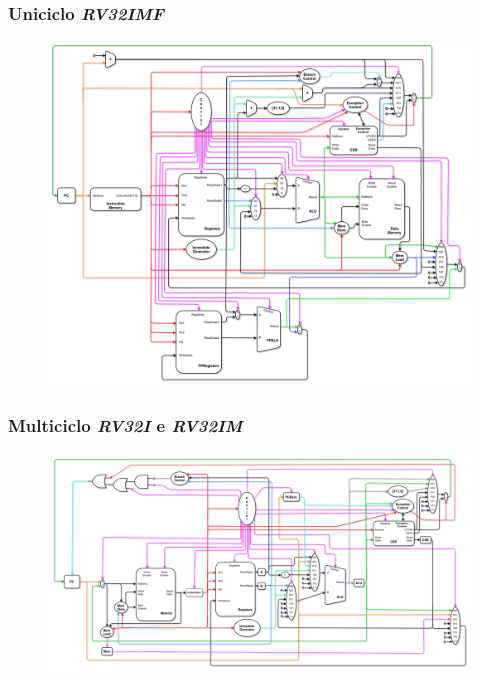 \documentclass[aspectratio=169]{beamer}
\begin{document}
    \begin{frame}
        \frametitle{Uniciclo \textit{RV32IMF}}
        \vfill
        \begin{figure}[H]
        \centering
            \includegraphics[width=.9\textwidth,height=.85\textheight,keepaspectratio]{../images/uarch_diagrams/singlecycle-RV32IMF.png}
        \end{figure}
        \vfill
    \end{frame}

    \begin{frame}
        \frametitle{Multiciclo \textit{RV32I} e \textit{RV32IM}}
        \vfill
        \begin{figure}[H]
        \centering
            \includegraphics[width=.95\textwidth,height=.9\textheight,keepaspectratio]{../images/uarch_diagrams/multicycle-RV32I-RV32IM.png}
        \end{figure}
        \vfill
    \end{frame}
\end{document}
